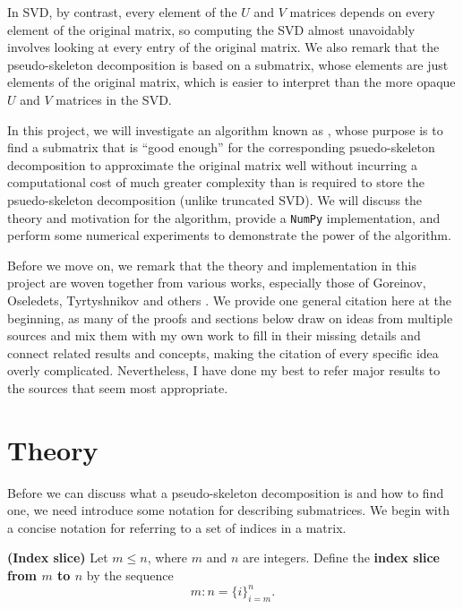 \documentclass{article}
\begin{document}
	In SVD, by contrast, every element of the $U$ and $V$ matrices depends on every element of the original matrix, so computing the SVD almost unavoidably involves looking at every entry of the original matrix. We also remark that the pseudo-skeleton decomposition is based on a submatrix, whose elements are just elements of the original matrix, which is easier to interpret than the more opaque $U$ and $V$ matrices in the SVD.
	
	In this project, we will investigate an algorithm known as \maxvol{} \cite{goreinov_2010}, whose purpose is to find a submatrix that is ``good enough'' for the corresponding psuedo-skeleton decomposition to approximate the original matrix well without incurring a computational cost of much greater complexity than is required to store the psuedo-skeleton decomposition (unlike truncated SVD). We will discuss the theory and motivation for the algorithm, provide a \texttt{NumPy} implementation, and perform some numerical experiments to demonstrate the power of the algorithm.
	
	Before we move on, we remark that the theory and implementation in this project are woven together from various works, especially those of Goreinov, Oseledets, Tyrtyshnikov and others \cite{goreinov_1997, goreinov_2010, oseledets_2010a, olshevsky_2001, oseledets_2009, hamm_2022}. We provide one general citation here at the beginning, as many of the proofs and sections below draw on ideas from multiple sources and mix them with my own work to fill in their missing details and connect related results and concepts, making the citation of every specific idea overly complicated. Nevertheless, I have done my best to refer major results to the sources that seem most appropriate.
	
	\section{Theory}
	
	Before we can discuss what a pseudo-skeleton decomposition is and how to find one, we need introduce some notation for describing submatrices. We begin with a concise notation for referring to a set of indices in a matrix.
	
	\begin{dfn} \textnormal{\bf(Index slice)}
		\label{def:index_slice}
		Let $m \le n$, where $m$ and $n$ are integers. Define the \textbf{index slice from $m$ to $n$} by the sequence
		\begin{equation}
			m: n = \{i\}_{i=m}^n.
		\end{equation}
	\end{dfn}
	
\end{document}
